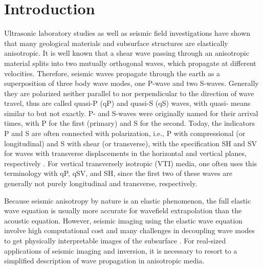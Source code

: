 %
\section{Introduction}
Ultrasonic laboratory studies as well as seismic field investigations have shown that many geological materials
and subsurface structures are elastically anisotropic.
It is well known that a shear wave passing through an anisotropic material splits into two mutually
 orthogonal waves, which propagate at different velocities.
Therefore, seismic waves propagate through the earth as a superposition of three body wave modes, one P-wave and two S-waves.
Generally they are polarized neither parallel to nor perpendicular to the direction of wave travel, 
thus are called quasi-P (qP) and quasi-S (qS) waves, with quasi- means similar to but not exactly.
P- and S-waves were originally named for their arrival times,
with P for the first (primary) and S for the second. Today, the indicators P and S are often connected with polarization,
 i.e., P with compressional (or longitudinal) and S with shear (or transverse), with the specification SH and SV for waves
 with transverse displacements in the horizontal and vertical planes, respectively \cite[]{winterstein:1990}.
For vertical transversely isotropic (VTI) media, one often uses this terminology with qP, qSV, and SH, since the first two of
these waves are generally not purely longitudinal and transverse, respectively.

Because seismic anisotropy by nature is an elastic phenomenon, the full elastic wave equation 
is usually more accurate for wavefield extrapolation than the acoustic equation.
However, seismic imaging
using the elastic wave equation involve high computational cost and many
challenges in decoupling wave modes to get
 physically interpretable images of the subsurface \cite[]{dellinger.etgen:1990,zhang.mcmechan:2010,yan.sava:2011,cheng.fomel:2014}.
For real-sized applications of seismic imaging and 
inversion, it is necessary to resort to a simplified description of wave
propagation in anisotropic media.

